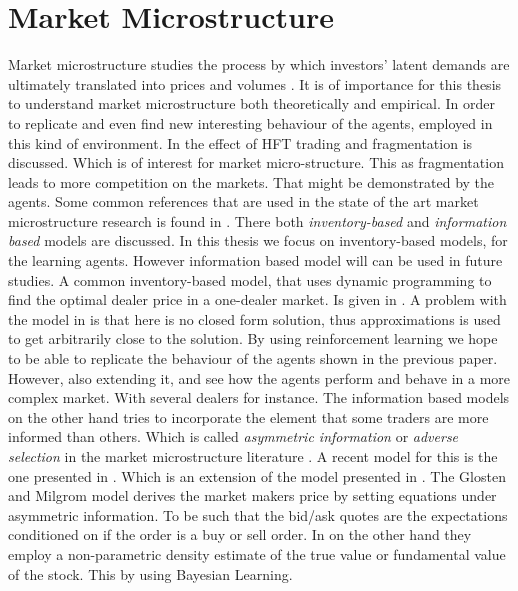 \documentclass{kththesis}
\theoremstyle{definition}
\begin{document}
\section{Market Microstructure}
Market microstructure studies the process by which investors' latent demands are ultimately translated into prices and volumes \parencite{madhavan2000market}. It is of importance for this thesis to understand market microstructure both theoretically and empirical. In order to replicate and even find new interesting behaviour of the agents, employed in this kind of environment. In \textcite{haferkorn2017high, agarwal2012high} the effect of HFT trading and fragmentation is discussed. Which is of interest for market micro-structure. This as fragmentation leads to more competition on the markets. That might be demonstrated by the agents. Some common references that are used in the state of the art market microstructure research is found in \parencite{o1995market,hasbrouck2007empirical, madhavan2000market, madhavan2002market}. There both \textit{inventory-based} and \textit{information based} models are discussed. In this thesis we focus on inventory-based models, for the learning agents. However information based model will can be used in future studies.
\newline
\newline
A common inventory-based model, that uses dynamic programming to find the optimal dealer price in a one-dealer market. Is given in \textcite{ho1981optimal}. A problem with the model in \parencite{ho1981optimal} is that here is no closed form solution, thus approximations is used to get arbitrarily close to the solution. By using reinforcement learning we hope to be able to replicate the behaviour of the agents shown in the previous paper. However, also extending it, and see how the agents perform and behave in a more complex market. With several dealers for instance. The information based models on the other hand tries to incorporate the element that some traders are more informed than others. Which is called \textit{asymmetric information} or \textit{adverse selection} in the market microstructure literature \parencite{o1995market, hasbrouck2007empirical}. 
\newline
\newline
A recent model for this is the one presented in \parencite{das2003intelligent, das2005learning}. Which is an extension of the model presented in \textcite{glosten1985bid}. The Glosten and Milgrom model derives the market makers price by setting equations under asymmetric information. To be such that the bid/ask quotes are the expectations conditioned on if the order is a buy or sell order. In \textcite{das2005learning} on the other hand they employ a non-parametric density estimate of the true value or fundamental value of the stock. This by using Bayesian Learning. 
\end{document}
